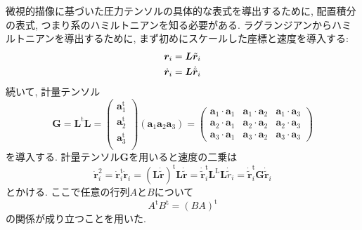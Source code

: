 微視的描像に基づいた圧力テンソルの具体的な表式を導出するために, 配置積分の表式, つまり系のハミルトニアンを知る必要がある. 
ラグランジアンからハミルトニアンを導出するために, まず初めにスケールした座標と速度を導入する:
\begin{align}
  \bm{r}_{i} &= \bm{L} \tilde{\bm{r}}_{i}
  \\ \notag
  \dot{\bm{r}}_{i} &= \bm{L} \dot{\tilde{\bm{r}}}_{i}
\end{align}
続いて, 計量テンソル
\begin{equation}
  \bm{G}
  =
  \bm{L}^{\mathrm{t}} \bm{L}
  =
  \left(
       \begin{array}{c}
        \bm{a}_{1}^{\mathrm{t}}  \\
        \bm{a}_{2}^{\mathrm{t}}  \\
        \bm{a}_{3}^{\mathrm{t}}  \\
       \end{array}
  \right)
  \left(\bm{a}_{1} \bm{a}_{2} \bm{a}_{3}\right)
  =
  \left(
       \begin{array}{ccc}
          \bm{a}_{1}\cdot\bm{a}_{1}
        & \bm{a}_{1}\cdot\bm{a}_{2}
        & \bm{a}_{1}\cdot\bm{a}_{3} \\
          \bm{a}_{2}\cdot\bm{a}_{1}
        & \bm{a}_{2}\cdot\bm{a}_{2}
        & \bm{a}_{2}\cdot\bm{a}_{3} \\
          \bm{a}_{3}\cdot\bm{a}_{1}
        & \bm{a}_{3}\cdot\bm{a}_{2}
        & \bm{a}_{3}\cdot\bm{a}_{3}
       \end{array}
  \right)
\end{equation}
を導入する. 計量テンソル$\bm{G}$を用いると速度の二乗は
\begin{equation}
  \dot{\bm{r}}_{i}^{2}
  =
  \dot{\bm{r}}_{i}^{\mathrm{t}} \dot{\bm{r}}_{i}
  =
  \left(\bm{L} \dot{\tilde{\bm{r}}} \right)^{\mathrm{t}} \bm{L} \dot{\tilde{\bm{r}}}
  =
  \dot{\tilde{\bm{r}}}_{i}^{\mathrm{t}} \bm{L}^{\mathrm{L}} \bm{L} \dot{\tilde{r}}_{i}
  =
  \dot{\tilde{\bm{r}}}_{i}^{\mathrm{t}} \bm{G} \dot{\tilde{\bm{r}}}_{i}
\end{equation}
とかける. ここで任意の行列$A$と$B$について
\begin{equation}
  A^{\mathrm{t}} B^{\mathrm{t}} = (BA)^{\mathrm{t}}
\end{equation}
の関係が成り立つことを用いた. 

